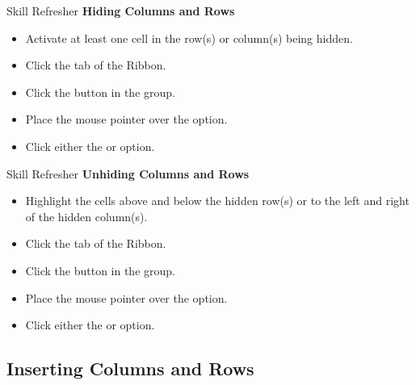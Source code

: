 \begin{center}
	\begin{sklbox}{Skill Refresher}
		\textbf{Hiding Columns and Rows}
		\\
		\begin{itemize}
			\setlength{\itemsep}{0pt}
			\setlength{\parskip}{0pt}
			\setlength{\parsep}{0pt}
			
			\item Activate at least one cell in the row(s) or column(s) being hidden.
			\item Click the  tab of the Ribbon.
			\item Click the  button in the  group.
			\item Place the mouse pointer over the  option.
			\item Click either the  or  option.
			
		\end{itemize}
	\end{sklbox}
\end{center}


\begin{center}
	\begin{sklbox}{Skill Refresher}
		\textbf{Unhiding Columns and Rows}
		\\
		\begin{itemize}
			\setlength{\itemsep}{0pt}
			\setlength{\parskip}{0pt}
			\setlength{\parsep}{0pt}
			
			\item Highlight the cells above and below the hidden row(s) or to the left and right of the hidden column(s).
			\item Click the  tab of the Ribbon.
			\item Click the  button in the  group.
			\item Place the mouse pointer over the  option.
			\item Click either the  or  option.
			
		\end{itemize}
	\end{sklbox}
\end{center}

\subsection{Inserting Columns and Rows}


